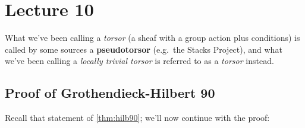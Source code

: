\hypertarget{lecture-10}{%
\section{Lecture 10}\label{lecture-10}}

\begin{remark}

What we've been calling a \emph{torsor} (a sheaf with a group action
plus conditions) is called by some sources a \textbf{pseudotorsor}
(e.g.~the Stacks Project), and what we've been calling a \emph{locally
trivial torsor} is referred to as a \emph{torsor} instead.

\end{remark}

\hypertarget{proof-of-grothendieck-hilbert-90}{%
\subsection{Proof of Grothendieck-Hilbert
90}\label{proof-of-grothendieck-hilbert-90}}

Recall that statement of \cref{thm:hilb90}; we'll now continue with the
proof:

